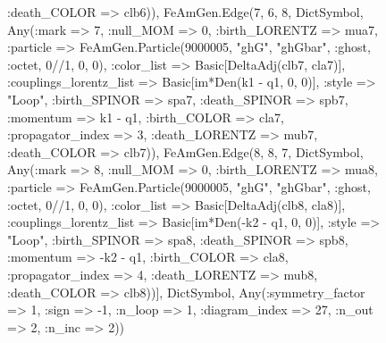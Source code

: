 \documentclass{revtex4}
\begin{document}
\begin{figure}[!htb]
\begin{center}
{:death_COLOR => clb6)), FeAmGen.Edge(7, 6, 8, Dict{Symbol, Any}(:mark => 7, :null_MOM => 0, :birth_LORENTZ => mua7, :particle => FeAmGen.Particle(9000005, "ghG", "ghGbar", :ghost, :octet, 0//1, 0, 0), :color_list => Basic[DeltaAdj(clb7, cla7)], :couplings_lorentz_list => Basic[im*Den(k1 - q1, 0, 0)], :style => "Loop", :birth_SPINOR => spa7, :death_SPINOR => spb7, :momentum => k1 - q1, :birth_COLOR => cla7, :propagator_index => 3, :death_LORENTZ => mub7, :death_COLOR => clb7)), FeAmGen.Edge(8, 8, 7, Dict{Symbol, Any}(:mark => 8, :null_MOM => 0, :birth_LORENTZ => mua8, :particle => FeAmGen.Particle(9000005, "ghG", "ghGbar", :ghost, :octet, 0//1, 0, 0), :color_list => Basic[DeltaAdj(clb8, cla8)], :couplings_lorentz_list => Basic[im*Den(-k2 - q1, 0, 0)], :style => "Loop", :birth_SPINOR => spa8, :death_SPINOR => spb8, :momentum => -k2 - q1, :birth_COLOR => cla8, :propagator_index => 4, :death_LORENTZ => mub8, :death_COLOR => clb8))], Dict{Symbol, Any}(:symmetry_factor => 1, :sign => -1, :n_loop => 1, :diagram_index => 27, :n_out => 2, :n_inc => 2)) 
}
\end{center}
\end{figure}
\end{document}
